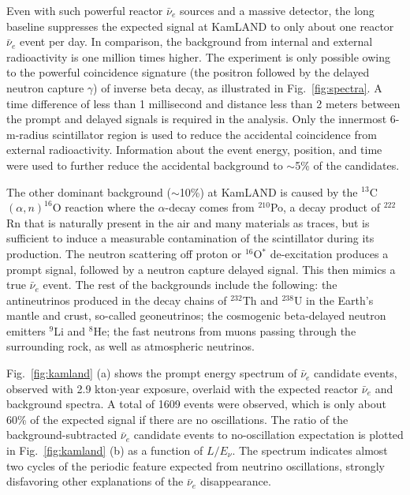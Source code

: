 \documentclass[aps,twocolumn,preprintnumbers,amsmath,superscriptaddress,amssymb,floats,nofootinbib]{revtex4-1}
\begin{document}
Even with such powerful reactor $\bar\nu_e$ sources and a massive detector, the long baseline suppresses the expected signal at KamLAND to only about one reactor $\bar\nu_e$ event per day.
In comparison, the background from internal and external radioactivity is one million times higher.
The experiment is only possible owing to the powerful coincidence signature (the positron followed by the delayed neutron capture $\gamma$) of inverse beta decay, as illustrated in Fig.~\ref{fig:spectra}.
A time difference of less than 1 millisecond and distance less than 2 meters between the prompt and delayed signals is required in the analysis.
Only the innermost 6-m-radius scintillator region is used to reduce the accidental coincidence from external radioactivity.
Information about the event energy, position, and time were used to further reduce the accidental background to $\sim$5\% of the candidates.

The other dominant background ($\sim$10\%) at KamLAND is caused by the $^{13}$C$(\alpha,n)^{16}$O reaction where the $\alpha$-decay comes from $^{210}$Po,
a decay product of $^{222}$Rn that is naturally present in the air and many materials as traces, but is sufficient to induce a measurable contamination of the scintillator during its production.
The neutron scattering off proton or $^{16}$O$^*$ de-excitation produces a prompt signal, followed by a neutron capture delayed signal. This then mimics a true $\bar\nu_e$ event. The rest of the backgrounds include the following: the antineutrinos produced in the decay chains of $^{232}$Th and $^{238}$U in the Earth's mantle and crust, so-called geoneutrinos; the cosmogenic beta-delayed neutron emitters $^{9}$Li and $^{8}$He;  the fast neutrons from muons passing through the surrounding rock, as well as atmospheric neutrinos.

Fig.~\ref{fig:kamland} (a) shows the prompt energy spectrum of $\bar\nu_e$ candidate
events, observed with 2.9 kton$\cdot$year exposure, overlaid with the expected reactor $\bar\nu_{e}$ and background spectra. A total of 1609 events were observed, which is only about 60\% of the expected signal if there are no oscillations. The ratio of the background-subtracted $\bar\nu_e$ candidate events to no-oscillation expectation is plotted in Fig.~\ref{fig:kamland} (b) as a function of $L/E_{\nu}$. The spectrum indicates almost two cycles of the periodic feature expected from neutrino oscillations, strongly disfavoring other explanations of the $\bar\nu_e$ disappearance.
\end{document}
